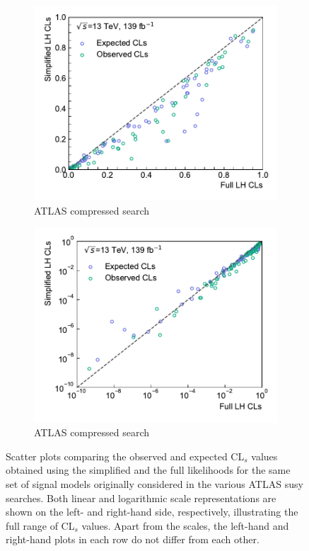 \begin{figure}
\begin{subfigure}[b]{0.5\textwidth}
		\centering\includegraphics[width=\textwidth]{cls_scatter_compressed_lin}
		\caption{ATLAS compressed search~\cite{SUSY-2018-16}}
	\end{subfigure}\hfill
	\begin{subfigure}[b]{0.5\textwidth}
		\centering\includegraphics[width=\textwidth]{cls_scatter_compressed_log}
		\caption{ATLAS compressed search~\cite{SUSY-2018-16}}
	\end{subfigure}\hfill
	\caption{Scatter plots comparing the observed and expected CL$_s$ values obtained using the simplified and the full likelihoods for the same set of signal models originally considered in the various ATLAS \gls{susy} searches. Both linear and logarithmic scale representations are shown on the left- and right-hand side, respectively, illustrating the full range of CL$_s$ values. Apart from the scales, the left-hand and right-hand plots in each row do not differ from each other.}\label{fig:app_results_cls_2}
\end{figure}



